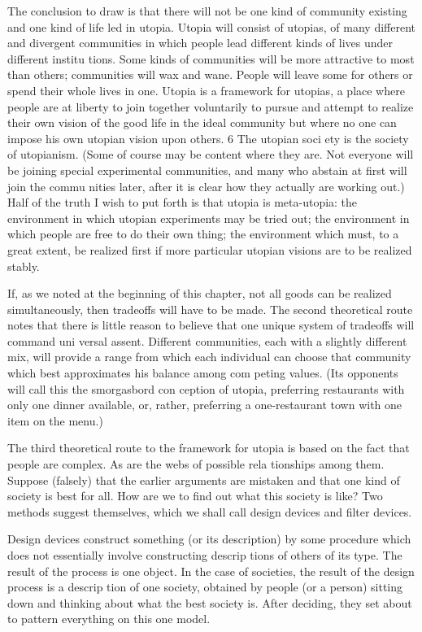 \documentclass[11pt,openany]{book}
\begin{document}
The conclusion to draw is that there will not be one kind of community existing and one kind of life led in utopia. Utopia will consist of utopias, of many different and divergent communities in which people lead different kinds of lives under different institu tions. Some kinds of communities will be more attractive to most than others; communities will wax and wane. People will leave some for others or spend their whole lives in one. Utopia is a framework for utopias, a place where people are at liberty to join together voluntarily to pursue and attempt to realize their own vision of the good life in the ideal community but where no one can impose his own utopian vision upon others. 6 The utopian soci ety is the society of utopianism. (Some of course may be content where they are. Not everyone will be joining special experimental communities, and many who abstain at first will join the commu nities later, after it is clear how they actually are working out.) Half of the truth I wish to put forth is that utopia is meta-utopia: the environment in which utopian experiments may be tried out; the environment in which people are free to do their own thing; the environment which must, to a great extent, be realized first if more particular utopian visions are to be realized stably. 

If, as we noted at the beginning of this chapter, not all goods can be realized simultaneously, then tradeoffs will have to be made. The second theoretical route notes that there is little reason to believe that one unique system of tradeoffs will command uni versal assent. Different communities, each with a slightly different mix, will provide a range from which each individual can choose that community which best approximates his balance among com peting values. (Its opponents will call this the smorgasbord con ception of utopia, preferring restaurants with only one dinner available, or, rather, preferring a one-restaurant town with one item on the menu.) 

The third theoretical route to the framework for utopia is based on the fact that people are complex. As are the webs of possible rela tionships among them. Suppose (falsely) that the earlier arguments are mistaken and that one kind of society is best for all. How are we to find out what this society is like? Two methods suggest themselves, which we shall call design devices and filter devices. 

Design devices construct something (or its description) by some procedure which does not essentially involve constructing descrip tions of others of its type. The result of the process is one object. In the case of societies, the result of the design process is a descrip tion of one society, obtained by people (or a person) sitting down and thinking about what the best society is. After deciding, they set about to pattern everything on this one model. 
\end{document}
